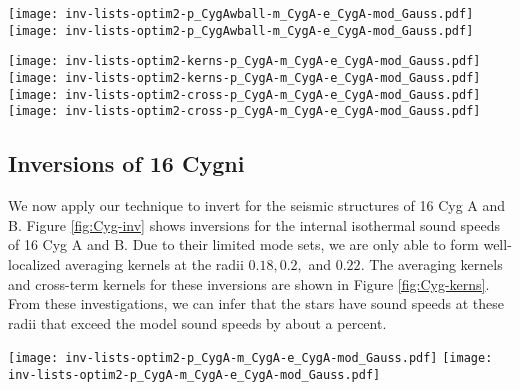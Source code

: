 \documentclass[twocolumn,twocolappendix]{aastex6}
\begin{document}
\begin{figure*}%
    \texttt{[image: inv-lists-optim2-p\_CygAwball-m\_CygA-e\_CygA-mod\_Gauss.pdf]}%
    \texttt{[image: inv-lists-optim2-p\_CygAwball-m\_CygA-e\_CygA-mod\_Gauss.pdf]}
    \caption{Results of the SOLA inversion-for-agreement method for the structure of a solar model (left) and stellar model with an unknown mass and radius (right) using the BiSON mode set () and the 16 Cyg A mode set (). The differences are shown in the sense of (model - star)/model, with the true relative difference in the isothermal sound speed profile $u$ shown with a gray dashed line.}
    \label{fig:model-inv} 
\end{figure*}

\begin{figure*}%
    \texttt{[image: inv-lists-optim2-kerns-p\_CygA-m\_CygA-e\_CygA-mod\_Gauss.pdf]}
    \texttt{[image: inv-lists-optim2-kerns-p\_CygA-m\_CygA-e\_CygA-mod\_Gauss.pdf]}\\
    \texttt{[image: inv-lists-optim2-cross-p\_CygA-m\_CygA-e\_CygA-mod\_Gauss.pdf]}%
    \texttt{[image: inv-lists-optim2-cross-p\_CygA-m\_CygA-e\_CygA-mod\_Gauss.pdf]}
    \caption{Averaging (top) and cross-term (bottom) kernels for the SOLA inversion-for-agreement of a solar model (left) and a stellar model (right) using the 16 Cyg A mode set.}
    \label{fig:model-kerns} 
\end{figure*}


\subsection{Inversions of 16 Cygni} 
We now apply our technique to invert for the seismic structures of 16 Cyg A and B. Figure \ref{fig:Cyg-inv} shows inversions for the internal isothermal sound speeds of 16 Cyg A and B. Due to their limited mode sets, we are only able to form well-localized averaging kernels at the radii $0.18, 0.2,$ and $0.22$. The averaging kernels and cross-term kernels for these inversions are shown in Figure \ref{fig:Cyg-kerns}. From these investigations, we can infer that the stars have sound speeds at these radii that exceed the model sound speeds by about a percent. 

\begin{figure*}%
    \texttt{[image: inv-lists-optim2-p\_CygA-m\_CygA-e\_CygA-mod\_Gauss.pdf]}%
    \texttt{[image: inv-lists-optim2-p\_CygA-m\_CygA-e\_CygA-mod\_Gauss.pdf]}%
    \caption{OLA inversion for relative differences in the isothermal sound speed $u$ between 16 Cyg A and its best-fitting evolutionary model (left) and 16 Cyg B and its model (right) at target radii $r_0 = 0.18, 0.2, 0.22$. The sound speed of the model at these radii is approximately 1\% lower than the star. TODO: insert Cyg B plots } 
    \label{fig:Cyg-inv} 
\end{figure*}
\end{document}
